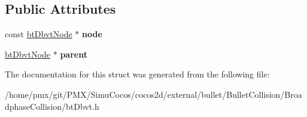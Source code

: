 \subsection*{Public Attributes}
\begin{DoxyCompactItemize}
\item 
\mbox{\label{structbtDbvt_1_1sStkCLN_ab078372859c3dd56feba354a04b83b32}} 
const \hyperlink{structbtDbvtNode}{bt\+Dbvt\+Node} $\ast$ {\bfseries node}
\item 
\mbox{\label{structbtDbvt_1_1sStkCLN_a8c082ecef763ac11a5d2ec5984cc8c7e}} 
\hyperlink{structbtDbvtNode}{bt\+Dbvt\+Node} $\ast$ {\bfseries parent}
\end{DoxyCompactItemize}


The documentation for this struct was generated from the following file\+:\begin{DoxyCompactItemize}
\item 
/home/pmx/git/\+P\+M\+X/\+Simu\+Cocos/cocos2d/external/bullet/\+Bullet\+Collision/\+Broadphase\+Collision/bt\+Dbvt.\+h\end{DoxyCompactItemize}
